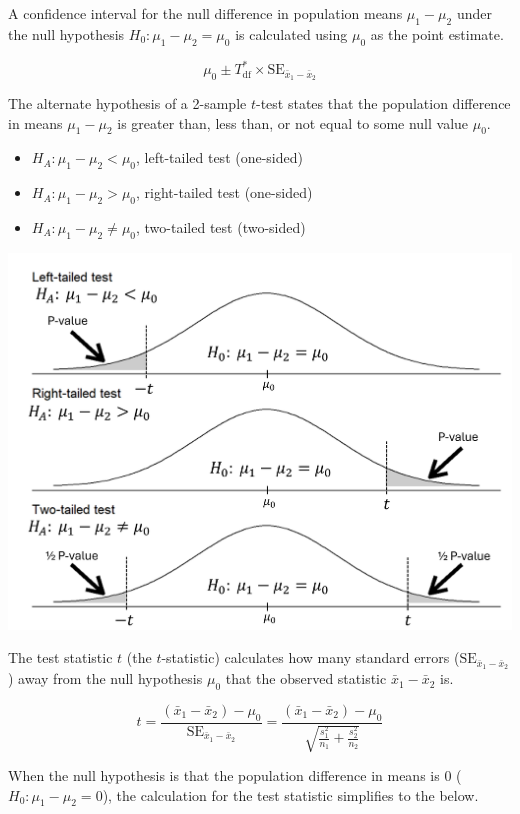 \documentclass[
  letterpaper,
  DIV=11,
  numbers=noendperiod]{scrartcl}
\begin{document}
A confidence interval for the null difference in population means
\(\mu_1-\mu_2\) under the null hypothesis
\(H_0 \colon \mu_1-\mu_2=\mu_0\) is calculated using \(\mu_0\) as the
point estimate.

\[
\mu_0 \pm T_{\text{df}}^* \times \text{SE}_{\bar{x}_1-\bar{x}_2}
\]

The alternate hypothesis of a 2-sample \(t\)-test states that the
population difference in means \(\mu_1-\mu_2\) is greater than, less
than, or not equal to some null value \(\mu_0\).

\begin{itemize}
\item
  \(H_A \colon \mu_1-\mu_2 < \mu_0\), left-tailed test (one-sided)
\item
  \(H_A \colon \mu_1-\mu_2 > \mu_0\), right-tailed test (one-sided)
\item
  \(H_A \colon \mu_1-\mu_2 \ne \mu_0\), two-tailed test (two-sided)
\end{itemize}

\includegraphics{cheatsheet_files/mediabag/two-sample-t-test.png}

The test statistic \(t\) (the \(t\)-statistic) calculates how many
standard errors (\(\text{SE}_{\bar{x}_1-\bar{x}_2}\)) away from the null
hypothesis \(\mu_0\) that the observed statistic \(\bar{x}_1-\bar{x}_2\)
is.

\[
t=\frac{(\bar{x}_1-\bar{x}_2)-\mu_0}{\text{SE}_{\bar{x}_1-\bar{x}_2}}=\frac{(\bar{x}_1-\bar{x}_2)-\mu_0}{\sqrt{\frac{s_1^2}{n_1}+\frac{s_2^2}{n_2}}}
\]

When the null hypothesis is that the population difference in means is 0
(\(H_0 \colon \mu_1-\mu_2=0\)), the calculation for the test statistic
simplifies to the below.
\end{document}
